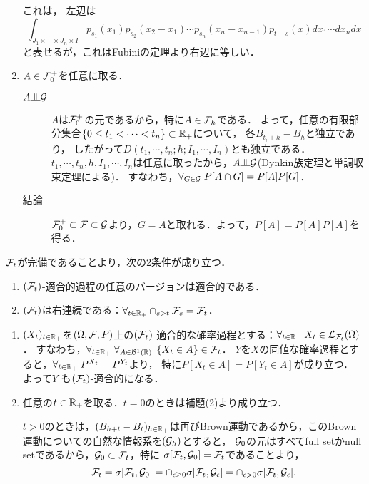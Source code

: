 \documentclass[uplatex,dvipdfmx]{jsreport}
\begin{document}
\begin{Proof}
\begin{enumerate}
        これは，%
        左辺は
        \[\int_{J_1\times\cdots\times J_n\times I}p_{s_1}(x_1)p_{s_2}(x_2-x_1)\cdots p_{s_n}(x_n-x_{n-1})p_{t-s}(x)dx_1\cdots dx_ndx\]
        と表せるが，これはFubiniの定理より右辺に等しい．
        \item 
        $A\in\mathcal{F}^+_0$を任意に取る．
        \begin{description}
            \item[$A\indep\cG$] $A$は$\mathcal{F}^+_0$の元であるから，特に$A\in\mathcal{F}_h$である．
            よって，任意の有限部分集合$\{0\le t_1<\cdots<t_n\}\subset\mathbb{R}_+$について，
            各$B_{t_i+h}-B_{h}$と独立であり，
            したがって$D(t_1,\cdots,t_n;h;I_1,\cdots,I_n)$とも独立である．
            $t_1,\cdots,t_n,h,I_1,\cdots,I_n$は任意に取ったから，$A\indep\cG$(Dynkin族定理と単調収束定理による)．
            すなわち，$\forall_{G\in\mathcal{G}}\;P[A\cap G]=P[A]P[G]$．
            \item[結論] 
            $\mathcal{F}^+_0\subset\mathcal{F}\subset\mathcal{G}$より，$G=A$と取れる．よって，$P[A]=P[A]P[A]$を得る．
        \end{description}
    \end{enumerate}
\end{Proof}

\begin{lemma}[自然な情報系の右連続性]
    $\mathcal{F}_t$が完備であることより，次の2条件が成り立つ．
    \begin{enumerate}
        \item $(\mathcal{F}_t)$-適合的過程の任意のバージョンは適合的である．
        \item $(\mathcal{F}_t)$は右連続である：$\forall_{t\in\mathbb{R}_+}\cap_{s>t}\mathcal{F}_s=\mathcal{F}_t$．
    \end{enumerate}
\end{lemma}
\begin{Proof}\mbox{}
    \begin{enumerate}
        \item $(X_t)_{t\in\mathbb{R}_+}$を$(\Omega,\mathcal{F},P)$上の$(\mathcal{F}_t)$-適合的な確率過程とする：$\forall_{t\in\mathbb{R}_+}\;X_t\in\mathcal{L}_{\mathcal{F}_t}(\Omega)$．
        すなわち，$\forall_{t\in\mathbb{R}_+}\;\forall_{A\in\mathcal{B}^1(\mathbb{R})}\;\left\{X_t\in A\right\}\in\mathcal{F}_t$．
        $Y$を$X$の同値な確率過程とすると，$\forall_{t\in\mathbb{R}_+}\;P^{X_t}=P^{Y_t}$より，
        特に$P[X_t\in A]=P[Y_t\in A]$が成り立つ．
        よって$Y$
        も$(\mathcal{F}_t)$-適合的になる．
        \item 
        任意の$t\in\mathbb{R}_+$を取る．$t=0$のときは補題(2)より成り立つ．

        $t>0$のときは，$(B_{h+t}-B_t)_{h\in\mathbb{R}_+}$は再びBrown運動であるから，このBrown運動についての自然な情報系を$(\mathcal{G}_h)$とすると，
        $\mathcal{G}_0$の元はすべてfull setかnull setであるから，$\mathcal{G}_0\subset\mathcal{F}_t$，特に
        $\sigma[\mathcal{F}_t,\mathcal{G}_0]=\mathcal{F}_t$であることより，
        \[\mathcal{F}_t=\sigma[\mathcal{F}_t,\mathcal{G}_0]=\cap_{\epsilon\ge0}\sigma[\mathcal{F}_t,\mathcal{G}_\epsilon]=\cap_{\epsilon>0}\sigma[\mathcal{F}_t,\mathcal{G}_\epsilon].\]
    \end{enumerate}
\end{Proof}
\end{document}
